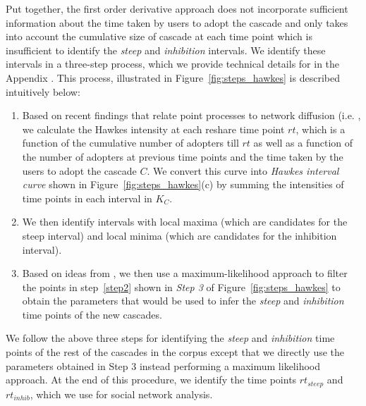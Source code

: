 \documentclass[smallextended]{svjour3}       %
\theoremstyle{definition}
\begin{document}
Put together, the first order derivative approach does not incorporate sufficient information about the time taken by users to adopt the cascade and only takes into account the cumulative size of cascade at each time point which is insufficient to identify the \textit{steep} and \textit{inhibition} intervals.  We identify these intervals in a three-step process, which we provide technical details for in the Appendix \label{f1}.  This process, illustrated in Figure~\ref{fig:steps_hawkes} is described intuitively below:
\begin{enumerate}
	\item Based on recent findings that relate point processes to network diffusion (i.e. \cite{seismic}\cite{hawkes_zha}, we calculate the Hawkes intensity at each reshare time point $rt$, which is a function of the cumulative number of adopters till $rt$  as well as a function of the number of adopters at previous time points and the time taken by the users to adopt the cascade $C$. We convert this curve into \textit{Hawkes interval curve} shown in Figure~\ref{fig:steps_hawkes}(c) by  summing the intensities of time points in each interval in $K_C$.
	\item\label{step2} We then identify intervals with local maxima (which are candidates for the steep interval) and local minima (which are candidates for the inhibition interval).
	\item Based on ideas from \cite{hawkes_zha}, we then use a maximum-likelihood approach to filter the points in step~\ref{step2} shown in \textit{Step 3} of Figure~\ref{fig:steps_hawkes} to obtain the parameters that would be used to infer the \textit{steep} and \textit{inhibition} time points of the new cascades.
\end{enumerate}

\noindent We follow the above three steps for identifying the \textit{steep} and \textit{inhibition} time points of the rest of the cascades in the corpus except that we directly use the parameters obtained in Step 3 instead performing a maximum likelihood approach. At the end of this procedure, we identify the  time points $rt_{steep}$ and $rt_{inhib}$, which we use for social network analysis.  
\end{document}
